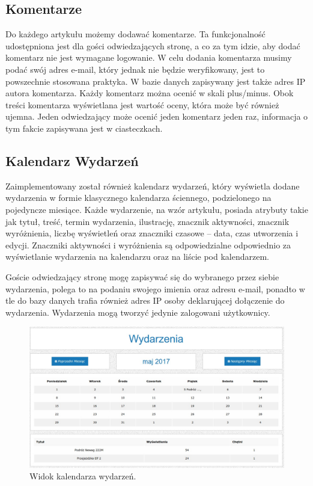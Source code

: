\documentclass[openright]{xmgr}
\begin{document}
\subsection{Komentarze}
Do każdego artykułu możemy dodawać komentarze. Ta funkcjonalność udostępniona jest dla gości odwiedzających stronę, a co za tym idzie, aby dodać komentarz nie jest wymagane logowanie. W celu dodania komentarza musimy podać swój adres e-mail, który jednak nie będzie weryfikowany, jest to powszechnie stosowana praktyka. W bazie danych zapisywany jest także adres IP autora komentarza. Każdy komentarz można ocenić w skali plus/minus. Obok treści komentarza wyświetlana jest wartość oceny, która może być również ujemna. Jeden odwiedzający może ocenić jeden komentarz jeden raz, informacja o tym fakcie zapisywana jest w ciasteczkach.

\newpage

\subsection{Kalendarz Wydarzeń}
Zaimplementowany został również kalendarz wydarzeń, który wyświetla dodane wydarzenia w formie klasycznego kalendarza ściennego, podzielonego na pojedyncze miesiące. Każde wydarzenie, na wzór artykułu, posiada atrybuty takie jak tytuł, treść, termin wydarzenia, ilustrację, znacznik aktywności, znacznik wyróżnienia, liczbę wyświetleń oraz znaczniki czasowe – data, czas utworzenia i edycji. Znaczniki aktywności i wyróżnienia są odpowiedzialne odpowiednio za wyświetlanie wydarzenia na kalendarzu oraz na liście pod kalendarzem. 

Goście odwiedzający stronę mogę zapisywać się do wybranego przez siebie wydarzenia, polega to na podaniu swojego imienia oraz adresu e-mail, ponadto w tle do bazy danych trafia również adres IP osoby deklarującej dołączenie do wydarzenia. Wydarzenia mogą tworzyć jedynie zalogowani użytkownicy.

\begin{figure}[!tbh]
\centering
\includegraphics[width=\linewidth]{fig/events}
\caption{Widok kalendarza wydarzeń.}
\end{figure}
\end{document}
